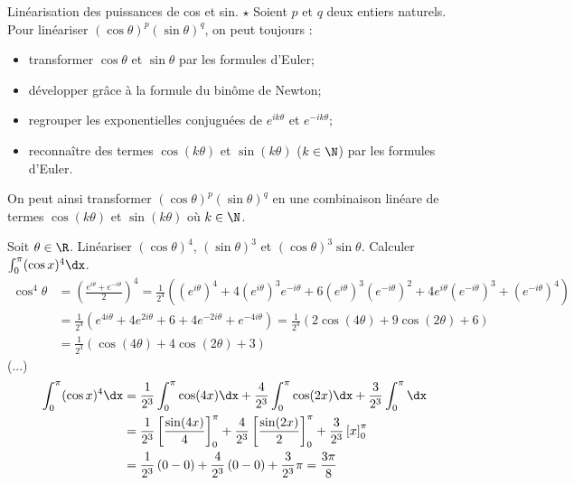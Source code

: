 \documentclass[11pt]{article}
\begin{document}
\begin{meth}{Linéarisation des puissances de cos et sin. $\star$}{}
    Soient $p$ et $q$ deux entiers naturels. Pour linéariser $(\cos \theta)^p(\sin\theta)^q$, on peut toujours :
    \begin{itemize}
        \item transformer $\cos\theta$ et $\sin\theta$ par les formules d'Euler;
        \item développer grâce à la formule du binôme de Newton;
        \item regrouper les exponentielles conjuguées de $e^{ik\theta}$ et $e^{-ik\theta}$;
        \item reconnaître des termes $\cos(k\theta)$ et $\sin(k\theta)$ ($k\in\N$) par les formules d'Euler.
    \end{itemize}
    On peut ainsi transformer $(\cos\theta)^p(\sin\theta)^q$ en une combinaison linéare de termes $\cos(k\theta)$ et $\sin(k\theta)$ où $k\in\N$.
\end{meth}

\begin{ex}{}{}
    Soit $\theta\in\R$. Linéariser $(\cos\theta)^4$, $(\sin\theta)^3$ et $(\cos\theta)^3\sin\theta$. Calculer $\int_0^\pi(\cos x)^4\dx$.
    \tcblower
     \begin{align*}
        \cos^4\theta&=\left( \frac{e^{i\theta}+e^{-i\theta}}{2} \right)^4=\frac{1}{2^4}\left( (e^{i\theta})^4+4(e^{i\theta})^3e^{-i\theta} + 6(e^{i\theta})^3(e^{-i\theta})^2 + 4e^{i\theta}(e^{-i\theta})^3+(e^{-i\theta})^4 \right)\\
        &=\frac{1}{2^4}\left( e^{4i\theta} + 4e^{2i\theta} + 6 + 4e^{-2i\theta} + e^{-4i\theta} \right)=\frac{1}{2^4}\left( 2\cos(4\theta) + 9\cos(2\theta) + 6 \right)\\
        &=\frac{1}{2^3}\left( \cos(4\theta) + 4\cos(2\theta) + 3\right)
    \end{align*}
    (...)\\
    \begin{align*}
        \int_0^\pi(\cos x)^4\dx&=\frac{1}{2^3}\int_0^\pi\cos(4x)\dx+\frac{4}{2^3}\int_{0}^\pi\cos(2x)\dx+\frac{3}{2^3}\int_0^\pi\dx\\
        &=\frac{1}{2^3}\left[ \frac{\sin(4x)}{4} \right]_0^\pi+\frac{4}{2^3}\left[ \frac{\sin(2x)}{2} \right]_0^\pi+\frac{3}{2^3}\left[ x \right]_0^\pi\\
        &=\frac{1}{2^3}\left( 0-0 \right)+\frac{4}{2^3}\left( 0-0 \right)+\frac{3}{2^3}\pi=\frac{3\pi}{8}
    \end{align*}
\end{ex}
\end{document}
